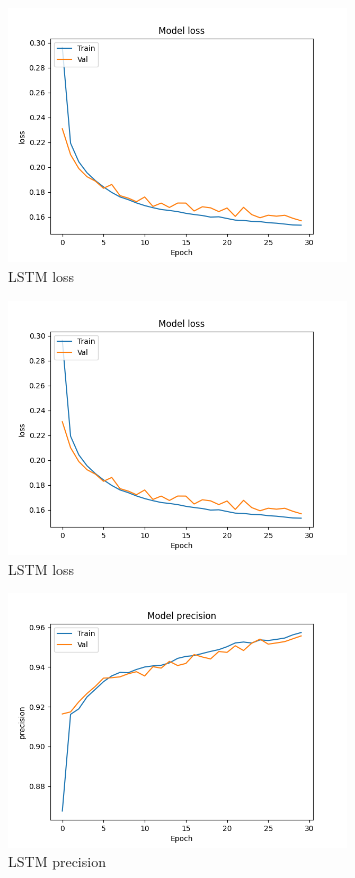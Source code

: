 \documentclass{article}
\begin{document}
    \begin{figure}[H]
        \centering
        \includegraphics[width=0.8\textwidth]{report_img/nn_results/feature_vector_lstm_26/metric_loss}
        \caption{LSTM loss}
        \label{fig:}
    \end{figure}

    \begin{figure}[H]
        \centering
        \includegraphics[width=0.8\textwidth]{report_img/nn_results/feature_vector_lstm_26/metric_loss}
        \caption{LSTM loss}
        \label{fig:}
    \end{figure}

    \begin{figure}[H]
        \centering
        \includegraphics[width=0.8\textwidth]{report_img/nn_results/feature_vector_lstm_26/metric_precision}
        \caption{LSTM precision}
        \label{fig:}
    \end{figure}
\end{document}
